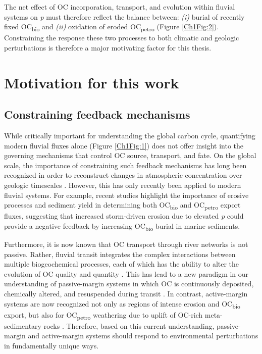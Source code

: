 The net effect of OC incorporation, transport, and evolution within fluvial systems on \textit{p} must therefore reflect the balance between: \textit{(i)} burial of recently fixed OC\textsubscript{bio} and \textit{(ii)} oxidation of eroded OC\textsubscript{petro} (Figure \ref{Ch1Fig:2}). Constraining the response these two processes to both climatic and geologic perturbations is therefore a major motivating factor for this thesis.

\section{Motivation for this work}

\subsection{Constraining feedback mechanisms}

While critically important for understanding the global carbon cycle, quantifying modern fluvial fluxes alone (Figure \ref{Ch1Fig:1}) does not offer insight into the governing mechanisms that control OC source, transport, and fate. On the global scale, the importance of constraining such feedback mechanisms has long been recognized in order to reconstruct changes in atmospheric  concentration over geologic timescales \citep{Berner:1999wj}. However, this has only recently been applied to modern fluvial systems. For example, recent studies \citep[\textit{e.g.}][]{Hilton:2008fo,Hilton:2012dt,Galy:2015fx} highlight the importance of erosive processes and sediment yield in determining both OC\textsubscript{bio} and OC\textsubscript{petro} export fluxes, suggesting that increased storm-driven erosion due to elevated \textit{p} could provide a negative feedback by increasing OC\textsubscript{bio} burial in marine sediments.

Furthermore, it is now known that OC transport through river networks is not passive. Rather, fluvial transit integrates the complex interactions between multiple biogeochemical processes, each of which has the ability to alter the evolution of OC quality and quantity \citep{Cole:2007gp,Aufdenkampe:2011fm,Bianchi:2011cu}. This has lead to a new paradigm in our understanding of passive-margin systems in which OC is continuously deposited, chemically altered, and resuspended during transit \citep[the so-called "river continuum"; Figure \ref{Ch1Fig:3};][]{Blair:2012du}. In contrast, active-margin systems are now recognized not only as regions of intense erosion and OC\textsubscript{bio} export, but also for OC\textsubscript{petro} weathering due to uplift of OC-rich meta-sedimentary rocks \citep[Figure \ref{Ch1Fig:3};][]{Milliman:1992fu}. Therefore, based on this current understanding, passive-margin and active-margin systems should respond to environmental perturbations in fundamentally unique ways.

